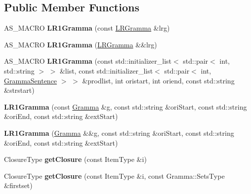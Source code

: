 \subsection*{Public Member Functions}
\begin{DoxyCompactItemize}
\item 
\mbox{\label{classx2_1_1_l_r1_gramma_afbd87724adfa33474132478f303209f5}} 
A\+S\+\_\+\+M\+A\+C\+RO {\bfseries L\+R1\+Gramma} (const \hyperlink{classx2_1_1_l_r_gramma}{L\+R\+Gramma} \&lrg)
\item 
\mbox{\label{classx2_1_1_l_r1_gramma_a29beef6aeb9b6519184e892d8a44e902}} 
A\+S\+\_\+\+M\+A\+C\+RO {\bfseries L\+R1\+Gramma} (\hyperlink{classx2_1_1_l_r_gramma}{L\+R\+Gramma} \&\&lrg)
\item 
\mbox{\label{classx2_1_1_l_r1_gramma_ace12408a94981c7d15256e1a7acf37a0}} 
A\+S\+\_\+\+M\+A\+C\+RO {\bfseries L\+R1\+Gramma} (const std\+::initializer\+\_\+list$<$ std\+::pair$<$ int, std\+::string $>$ $>$ \&list, const std\+::initializer\+\_\+list$<$ std\+::pair$<$ int, \hyperlink{classx2_1_1_gramma_sentence}{Gramma\+Sentence} $>$ $>$ \&prodlist, int oristart, int oriend, const std\+::string \&strstart)
\item 
\mbox{\label{classx2_1_1_l_r1_gramma_aa3812220d4cc3f0b9a1d5a67245c015e}} 
{\bfseries L\+R1\+Gramma} (const \hyperlink{classx2_1_1_gramma}{Gramma} \&g, const std\+::string \&ori\+Start, const std\+::string \&ori\+End, const std\+::string \&ext\+Start)
\item 
\mbox{\label{classx2_1_1_l_r1_gramma_a887c2408e69595d589138e99ce9154a6}} 
{\bfseries L\+R1\+Gramma} (\hyperlink{classx2_1_1_gramma}{Gramma} \&\&g, const std\+::string \&ori\+Start, const std\+::string \&ori\+End, const std\+::string \&ext\+Start)
\item 
\mbox{\label{classx2_1_1_l_r1_gramma_aff9f83c0779f9d638488bb3a112d8dd2}} 
Closure\+Type {\bfseries get\+Closure} (const Item\+Type \&i)
\item 
\mbox{\label{classx2_1_1_l_r1_gramma_ac764feebd3d5afcc0afd828afefbbe83}} 
Closure\+Type {\bfseries get\+Closure} (const Item\+Type \&i, const Gramma\+::\+Sets\+Type \&firstset)

\end{DoxyCompactItemize}
